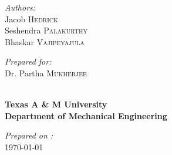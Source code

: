 \begin{titlepage}
\begin{center}
\end{center}
\begin{minipage}[c]{0.7\textwidth}
\begin{flushleft}
\emph{Authors:}\\[0.25cm]
Jacob \textsc{Hedrick} \\
Seshendra \textsc{ Palakurthy} \\
Bhaskar \textsc{Vajipeyajula} \\
\end{flushleft}
\end{minipage}
\begin{minipage}[c]{0.275\textwidth}
\begin{flushright}
\emph{Prepared for:}\\[0.25cm]
Dr. Partha \textsc{Mukherjee} \\
\end{flushright}
\end{minipage}
\begin{center}
~\\[0.75cm]
\textbf{Texas A \& M University} \\[0.25cm]
\textbf{Department of Mechanical Engineering} \\[0.25cm]

\vfill

\emph{Prepared on :} \\ 
{\large \today}

\end{center}
\end{titlepage}



